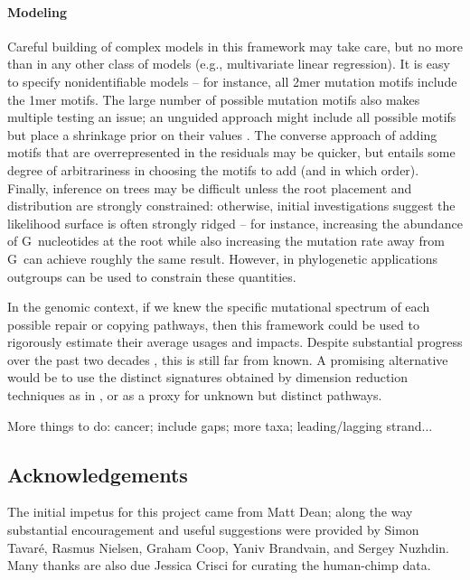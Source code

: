 \documentclass{article}
\newcommand{\nG}{\mbox{G}}
\theoremstyle{plain}
\theoremstyle{definition}
\begin{document}
\paragraph{Modeling}
Careful building of complex models in this framework may take care,
but no more than in any other class of models (e.g., multivariate linear regression).
It is easy to specify nonidentifiable models --
for instance, all 2mer mutation motifs include the 1mer motifs.
The large number of possible mutation motifs also makes multiple testing an issue;
an unguided approach might include all possible motifs but place a shrinkage prior on their values \citep{bhadra2015horseshoe}.
The converse approach of adding motifs that are overrepresented in the residuals
may be quicker, but entails some degree of arbitrariness in choosing the motifs to add (and in which order).
Finally, inference on trees may be difficult unless the root placement and distribution are strongly constrained:
otherwise, initial investigations suggest the likelihood surface is often strongly ridged --
for instance, increasing the abundance of \nG\ nucleotides at the root while also increasing the mutation rate away from \nG\
can achieve roughly the same result.
However, in phylogenetic applications outgroups can be used to constrain these quantities.

In the genomic context,
if we knew the specific mutational spectrum of each possible repair or copying pathways,
then this framework could be used to rigorously estimate their average usages and impacts.
Despite substantial progress over the past two decades \citep{goodman2013translesion,sale2012yfamily},
this is still far from known.
A promising alternative would be to use the distinct signatures obtained by dimension reduction techniques as in
\citet{alexandrov2013signatures}, \citep{mathieson2017differences} or \citep{shiraishi2015simple} as a proxy for unknown but distinct pathways.

More things to do: cancer; include gaps; more taxa; leading/lagging strand...


\subsection{Acknowledgements}
The initial impetus for this project came from Matt Dean;
along the way substantial encouragement and useful suggestions were provided by
Simon Tavar\'e, Rasmus Nielsen, Graham Coop, Yaniv Brandvain, and Sergey Nuzhdin.
Many thanks are also due Jessica Crisci for curating the human-chimp data.
\end{document}
